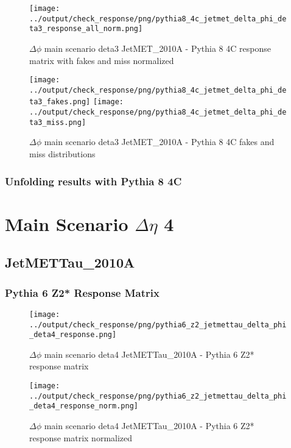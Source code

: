 \documentclass[11pt]{book}
\begin{document}
\begin{figure}[ht]
\centering
\texttt{[image: ../output/check\_response/png/pythia8\_4c\_jetmet\_delta\_phi\_deta3\_response\_all\_norm.png]}
\caption{$\Delta\phi$ main scenario deta3 JetMET\_2010A - Pythia 8 4C response matrix with fakes and miss normalized}
\label{p8_jetmet_delta_phi_deta3_response_all_norm}
\end{figure}

\begin{figure}[ht]
\centering
\texttt{[image: ../output/check\_response/png/pythia8\_4c\_jetmet\_delta\_phi\_deta3\_fakes.png]}
\texttt{[image: ../output/check\_response/png/pythia8\_4c\_jetmet\_delta\_phi\_deta3\_miss.png]}
\caption{$\Delta\phi$ main scenario deta3 JetMET\_2010A - Pythia 8 4C fakes and miss distributions}
\label{p8_jetmet_delta_phi_deta3_fakesmiss}
\end{figure}


\clearpage
\subsection{Unfolding results with Pythia 8 4C}



\newpage
\chapter{Main Scenario $\Delta\eta$ 4 }
\section{JetMETTau\_2010A}
\subsection{Pythia 6 Z2* Response Matrix}

\begin{figure}[ht]
\centering
\texttt{[image: ../output/check\_response/png/pythia6\_z2\_jetmettau\_delta\_phi\_deta4\_response.png]}
\caption{$\Delta\phi$ main scenario deta4 JetMETTau\_2010A - Pythia 6 Z2* response matrix}
\label{p6_jetmettau_delta_phi_deta4_response}
\end{figure}

\begin{figure}[ht]
\centering
\texttt{[image: ../output/check\_response/png/pythia6\_z2\_jetmettau\_delta\_phi\_deta4\_response\_norm.png]}
\caption{$\Delta\phi$ main scenario deta4 JetMETTau\_2010A - Pythia 6 Z2* response matrix normalized}
\label{p6_jetmettau_delta_phi_deta4_response_norm}
\end{figure}
\end{document}
